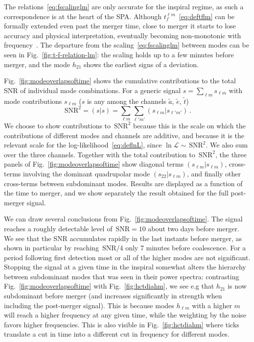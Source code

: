 \documentclass[aps,showpacs,twocolumn,prd,superscriptaddress,nofootinbib]{revtex4-1}
\newcommand{\be}{\begin{equation}}
\newcommand{\ee}{\end{equation}}
\newcommand\calL{{\mathcal{L}}}
\newcommand{\SNR}{\,\mathrm{SNR}}
\begin{document}
The relations~\eqref{eq:fscalinglm} are only accurate for the inspiral regime, as such a correspondence is at the heart of the SPA.
Although $t_{f}^{\ell m}$~\eqref{eq:deftflm} can be formally extended even past the merger time, close to merger it starts to lose accuracy and physical interpretation, eventually becoming non-monotonic with frequency~\cite{MB18}.
The departure from the scaling~\eqref{eq:fscalinglm} between modes can be seen in Fig.~\ref{fig:t-f-relation-lm}: the scaling holds up to a few minutes before merger, and the mode $h_{21}$ shows the earliest signs of a deviation.

Fig.~\ref{fig:modeoverlapsoftime} shows the cumulative contributions to the total SNR of individual mode combinations. For a generic signal $s = \sum_{\ell m} s_{\ell m}$ with mode contributions $s_{\ell m}$ ($s$ is any among the channels $\tilde{a}$, $\tilde{e}$, $\tilde{t}$)
\be\label{eq:defcontribSNR2}
	\SNR^{2} = (s|s) = \sum_{\ell m} \sum_{\ell' m'} (s_{\ell m} | s_{\ell' m'}) \,.
\ee
We choose to show contributions to $\SNR^{2}$ because this is the scale on which the contributions of different modes and channels are additive, and because it is the relevant scale for the log-likelihood~\eqref{eq:deflnL}, since $\ln \calL \sim \SNR^{2}$. We also sum over the three channels. Together with the total contribution to $\SNR^{2}$, the three panels of Fig.~\ref{fig:modeoverlapsoftime} show diagonal terms $(s_{\ell m} | s_{\ell m})$, cross-terms involving the dominant quadrupolar mode $(s_{22} | s_{\ell m})$, and finally other cross-terms between subdominant modes. Results are displayed as a function of the time to merger, and we show separately the result obtained for the full post-merger signal.

We can draw several conclusions from Fig.~\ref{fig:modeoverlapsoftime}. The signal reaches a roughly detectable level of $\SNR=10$ about two days before merger. We see that the SNR accumulates rapidly in the last instants before merger, as shown in particular by reaching $\SNR/4$ only 7 minutes before coalescence. For a period following first detection most or all of the higher modes are not significant. Stopping the signal at a given time in the inspiral somewhat alters the hierarchy between subdominant modes that was seen in their power spectra: contrasting Fig.~\ref{fig:modeoverlapsoftime} with Fig.~\ref{fig:hctdiahm}, we see e.g that $h_{21}$ is now subdominant before merger (and increases significantly in strength when including the post-merger signal). This is because modes $h_{\ell m}$ with a higher $m$ will reach a higher frequency at any given time, while the weighting by the noise favors higher frequencies. This is also visible in Fig.~\ref{fig:hctdiahm} where ticks translate a cut in time into a different cut in frequency for different modes.
\end{document}
